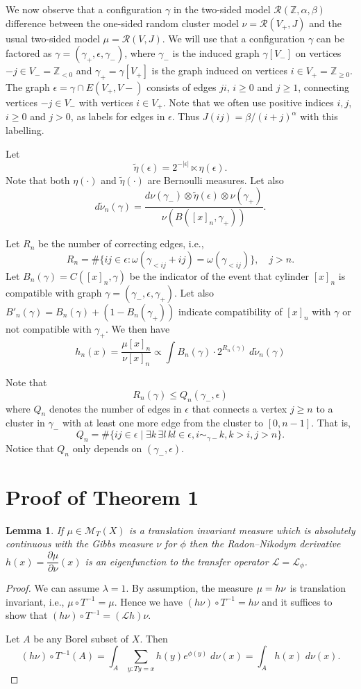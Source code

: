 \documentclass[11pt, a4paper]{amsart}
\newtheorem{lem}[thm]{Lemma}
\theoremstyle{definition}
\theoremstyle{remark}
\providecommand{\ZZ}{\mathbb{Z}}
\providecommand{\CM}{\mathscr{M}}
\providecommand{\mscr}{\mathscr}
\providecommand{\e}{\epsilon}
\providecommand{\g}{\gamma}
\def\X{X}
\def\T{T}
\begin{document}
We now observe that a configuration $\g$ in the two-sided model
$\mscr R(\ZZ,\alpha,\beta)$ difference between the one-sided random cluster model
$\nu = \mscr R(V_+,J)$ and the usual two-sided model $\mu = \mscr R(V,J)$. We will
use that a configuration $\g$ can be factored as $\g = (\g_+, \e, \g_-)$, where
$\g_-$ is the induced graph $\g[V_-]$ on vertices $-j\in V_-=\ZZ_{<0}$ and
$\g_+=\g[V_+]$ is the graph induced on vertices $i\in V_+=\ZZ_{\ge0}$. The graph
$\e=\g\cap E(V_+,V-)$ consists of edges $ji$, $i\ge0$ and $j\ge 1$, connecting vertices
$-j\in V_-$ with vertices $i\in V_+$. Note that we often use positive indices $i,j$,
$i\ge0$ and $j>0$, as labels for edges in $\e$. Thus $J(ij)=\beta/(i+j)^\alpha$ with this
labelling.

Let
$$ \tilde \eta(\epsilon)= 2^{-|\epsilon|} \ltimes \eta (\epsilon). $$
Note that both $\eta(\cdot)$ and $\tilde\eta (\cdot)$ are Bernoulli measures. Let also
$$ d\tilde \nu_n(\gamma) = \frac{d\nu(\gamma_-)\otimes \tilde \eta(\epsilon)\otimes \nu(\gamma_+)}{\nu(B([x]_n,\gamma_+))}. $$

Let $R_n$ be the number of correcting edges, i.e.,
$$
R_n=\# \{ij\in \epsilon: \omega (\gamma_{<ij}+ij)=\omega (\gamma_{<ij})\},\quad j>n.
$$
Let $B_n(\g)=C([x]_n,\gamma)$ be the indicator of the event that cylinder $[x]_n$ is compatible with graph $\g=(\g_-,\e,\g_+)$.
Let also $B'_n(\g) = B_n(\g) + (1-B_n(\g_+))$ indicate compatibility of $[x]_n$ with $\g$ or not compatible with $\g_+$.
We then have
\[
  h_n(x) = \frac{\mu [x]_n}{\nu [x]_n}\propto \int B_n(\g) \cdot 2^{R_n(\g)} \; d\tilde \nu_n (\gamma)
\]

Note that
$$ R_n(\g) \le Q_n(\g_-,\e) $$
where $Q_n$ denotes the number of edges in $\e$ that connects a vertex $j\ge n$ to a
cluster in $\g_-$ with at least one more edge from the cluster to $[0,n-1]$. That is,
$$  Q_n=\# \{ij \in \epsilon \mid  \exists k\, \exists l\, kl\in\e,  i \sim_{\gamma-} k, k>i, j > n\}.$$
Notice that $Q_n$ only depends on $(\gamma_-,\epsilon)$.



\section{Proof of Theorem 1}\noindent

\begin{lem}
  If $\mu\in\CM_\T(\X)$ is a translation invariant measure which is absolutely
  continuous with the Gibbs measure $\nu$ for $\phi$ then the Radon--Nikodym
  derivative $h(x)=\dfrac{\partial\mu}{\partial\nu}(x)$ is an eigenfunction to the transfer
  operator $\mscr L =\mscr L_\phi$.
\end{lem}
\begin{proof}
  We can assume $\lambda=1$. By assumption, the measure $\mu= h \nu$ is translation
  invariant, i.e., $\mu\circ T^{-1}=\mu$. Hence we have $(h\nu)\circ T^{-1}=h\nu$ and it
  suffices to show that $(h\nu) \circ T^{-1}=({\mathcal L}h)\nu$.

  Let $A$ be any Borel subset of $\X$. Then
  $$(h\nu)\circ T^{-1} (A)=\int_A \sum_{y: Ty=x} h(y)e^{\phi(y)}\; d\nu(x)=\int_A h(x)\; d\nu(x).$$
\end{proof}
\end{document}
